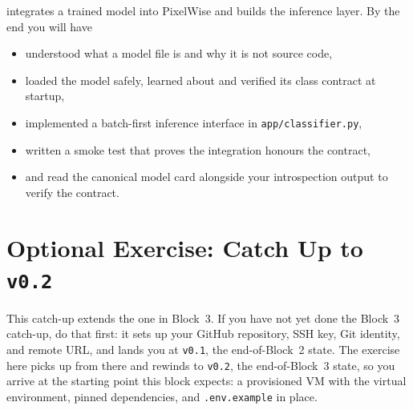 
 integrates a trained model into PixelWise
and builds the inference layer.
By the end you will have
\begin{itemize}
    \item understood what a model file is and why it is not source code,
    \item loaded the model safely, learned about and verified its class contract at startup,
    \item implemented a batch-first inference interface in \texttt{app/classifier.py},
    \item written a smoke test that proves the integration honours the contract,
    \item and read the canonical model card alongside your introspection output to verify the contract.
\end{itemize}







\newpage
\section{Optional Exercise: Catch Up to \texttt{v0.2}}

This catch-up extends the one in Block~3. If you have not yet done the
Block~3 catch-up, do that first: it sets up your GitHub repository, SSH
key, Git identity, and remote URL, and lands you at \texttt{v0.1}, the
end-of-Block~2 state. The exercise here picks up from there and rewinds
to \texttt{v0.2}, the end-of-Block~3 state, so you arrive at the starting
point this block expects: a provisioned VM with the virtual environment,
pinned dependencies, and \texttt{.env.example}
in place.

